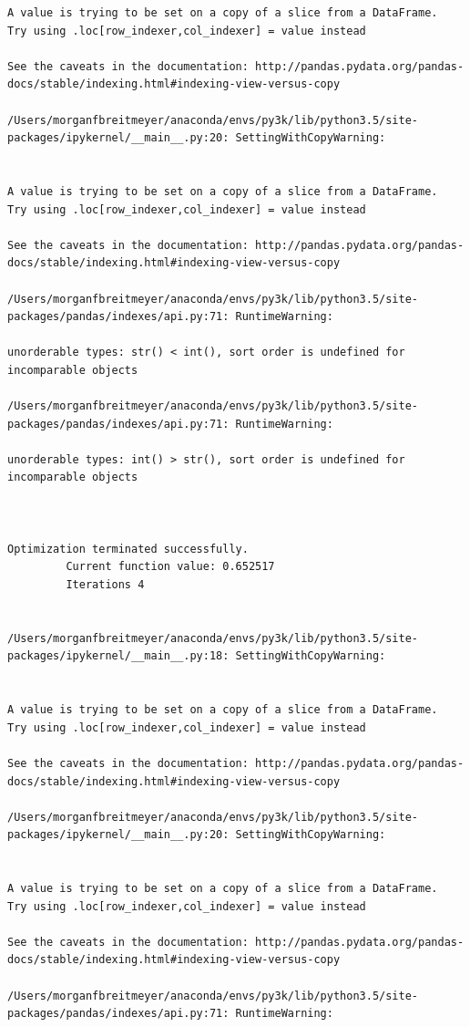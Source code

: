 \begin{lstlisting}
A value is trying to be set on a copy of a slice from a DataFrame.
Try using .loc[row_indexer,col_indexer] = value instead

See the caveats in the documentation: http://pandas.pydata.org/pandas-docs/stable/indexing.html#indexing-view-versus-copy

/Users/morganfbreitmeyer/anaconda/envs/py3k/lib/python3.5/site-packages/ipykernel/__main__.py:20: SettingWithCopyWarning:


A value is trying to be set on a copy of a slice from a DataFrame.
Try using .loc[row_indexer,col_indexer] = value instead

See the caveats in the documentation: http://pandas.pydata.org/pandas-docs/stable/indexing.html#indexing-view-versus-copy

/Users/morganfbreitmeyer/anaconda/envs/py3k/lib/python3.5/site-packages/pandas/indexes/api.py:71: RuntimeWarning:

unorderable types: str() < int(), sort order is undefined for incomparable objects

/Users/morganfbreitmeyer/anaconda/envs/py3k/lib/python3.5/site-packages/pandas/indexes/api.py:71: RuntimeWarning:

unorderable types: int() > str(), sort order is undefined for incomparable objects



Optimization terminated successfully.
         Current function value: 0.652517
         Iterations 4


/Users/morganfbreitmeyer/anaconda/envs/py3k/lib/python3.5/site-packages/ipykernel/__main__.py:18: SettingWithCopyWarning:


A value is trying to be set on a copy of a slice from a DataFrame.
Try using .loc[row_indexer,col_indexer] = value instead

See the caveats in the documentation: http://pandas.pydata.org/pandas-docs/stable/indexing.html#indexing-view-versus-copy

/Users/morganfbreitmeyer/anaconda/envs/py3k/lib/python3.5/site-packages/ipykernel/__main__.py:20: SettingWithCopyWarning:


A value is trying to be set on a copy of a slice from a DataFrame.
Try using .loc[row_indexer,col_indexer] = value instead

See the caveats in the documentation: http://pandas.pydata.org/pandas-docs/stable/indexing.html#indexing-view-versus-copy

/Users/morganfbreitmeyer/anaconda/envs/py3k/lib/python3.5/site-packages/pandas/indexes/api.py:71: RuntimeWarning:


\end{lstlisting}
